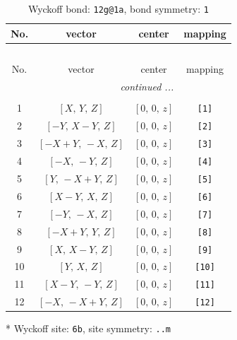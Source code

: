 \documentclass[fleqn,8pt]{jsarticle}
\begin{document}
\begin{longtable}{cccc}
\caption{Wyckoff bond: {\tt 12g@1a}, bond symmetry: {\tt 1}}
 \\
 \hline \hline
No. & vector & center & mapping \\ \hline \endfirsthead

\multicolumn{3}{l}{\tablename\ \thetable{}} \\
 \hline \hline
No. & vector & center & mapping \\ \hline \endhead

 \hline \hline
\multicolumn{3}{r}{\footnotesize\it continued ...} \\ \endfoot

 \hline \hline
\multicolumn{3}{r}{} \\ \endlastfoot

1 & $\left[ X,\, Y,\, Z \right]$ & $\left[ 0,\, 0,\, z \right]$ & {\tt [1]} \\ \hline
2 & $\left[ - Y,\, X - Y,\, Z \right]$ & $\left[ 0,\, 0,\, z \right]$ & {\tt [2]} \\ \hline
3 & $\left[ - X + Y,\, - X,\, Z \right]$ & $\left[ 0,\, 0,\, z \right]$ & {\tt [3]} \\ \hline
4 & $\left[ - X,\, - Y,\, Z \right]$ & $\left[ 0,\, 0,\, z \right]$ & {\tt [4]} \\ \hline
5 & $\left[ Y,\, - X + Y,\, Z \right]$ & $\left[ 0,\, 0,\, z \right]$ & {\tt [5]} \\ \hline
6 & $\left[ X - Y,\, X,\, Z \right]$ & $\left[ 0,\, 0,\, z \right]$ & {\tt [6]} \\ \hline
7 & $\left[ - Y,\, - X,\, Z \right]$ & $\left[ 0,\, 0,\, z \right]$ & {\tt [7]} \\ \hline
8 & $\left[ - X + Y,\, Y,\, Z \right]$ & $\left[ 0,\, 0,\, z \right]$ & {\tt [8]} \\ \hline
9 & $\left[ X,\, X - Y,\, Z \right]$ & $\left[ 0,\, 0,\, z \right]$ & {\tt [9]} \\ \hline
10 & $\left[ Y,\, X,\, Z \right]$ & $\left[ 0,\, 0,\, z \right]$ & {\tt [10]} \\ \hline
11 & $\left[ X - Y,\, - Y,\, Z \right]$ & $\left[ 0,\, 0,\, z \right]$ & {\tt [11]} \\ \hline
12 & $\left[ - X,\, - X + Y,\, Z \right]$ & $\left[ 0,\, 0,\, z \right]$ & {\tt [12]} \\
\end{longtable}
* Wyckoff site: {\tt 6b}, site symmetry: {\tt ..m}
\renewcommand{\arraystretch}{1.2}
\end{document}
